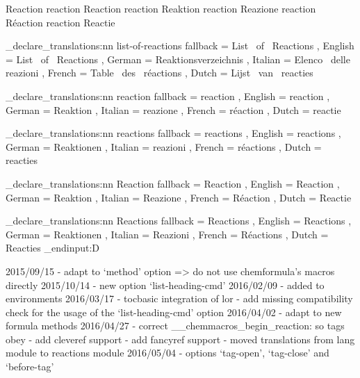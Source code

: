  {Reaction}
 {reaction} {Reaction}
  {reaction} {Reaktion}
 {reaction} {Reazione}
  {reaction} {R\'{e}action}
   {reaction} {Reactie}
\EndChemCompatibility

\chemmacros_declare_translations:nn {list-of-reactions}
  {
    fallback = List~ of~ Reactions ,
    English  = List~ of~ Reactions ,
    German   = Reaktionsverzeichnis ,
    Italian  = Elenco~ delle~ reazioni ,
    French   = Table~ des~ r\'{e}actions ,
    Dutch    = Lijst~ van~ reacties
  }

\chemmacros_declare_translations:nn {reaction}
  {
    fallback = reaction ,
    English  = reaction ,
    German   = Reaktion ,
    Italian  = reazione ,
    French   = r\'{e}action ,
    Dutch    = reactie
  }

\chemmacros_declare_translations:nn {reactions}
  {
    fallback = reactions ,
    English  = reactions ,
    German   = Reaktionen ,
    Italian  = reazioni ,
    French   = r\'{e}actions ,
    Dutch    = reacties
  }

\chemmacros_declare_translations:nn {Reaction}
  {
    fallback = Reaction ,
    English  = Reaction ,
    German   = Reaktion ,
    Italian  = Reazione ,
    French   = R\'{e}action ,
    Dutch    = Reactie
  }

\chemmacros_declare_translations:nn {Reactions}
  {
    fallback = Reactions ,
    English  = Reactions ,
    German   = Reaktionen ,
    Italian  = Reazioni ,
    French   = R\'{e}actions ,
    Dutch    = Reacties
 }
\EndChemCompatibility
\tex_endinput:D

2015/09/15 - adapt to `method' option => do not use chemformula's macros
             directly
2015/10/14 - new option `list-heading-cmd'
2016/02/09 - added \ignorespacesafterend to environments
2016/03/17 - tocbasic integration of lor
           - add missing compatibility check for the usage of the
             `list-heading-cmd' option
2016/04/02 - adapt to new formula methods
2016/04/27 - correct \__chemmacros_begin_reaction: so tags obey \thereaction
           - add cleveref support
           - add fancyref support
           - moved translations from lang module to reactions module
2016/05/04 - options `tag-open', `tag-close' and `before-tag'
